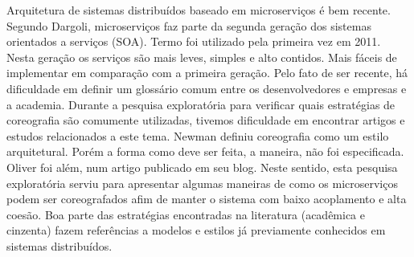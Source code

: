 \documentclass[12pt]{article}
\theoremstyle{plain}
\begin{document}
Arquitetura de sistemas distribuídos baseado em microserviços é bem recente. Segundo Dargoli, microserviços faz parte da segunda geração dos sistemas orientados a serviços (SOA). Termo foi utilizado pela primeira vez em 2011. Nesta geração os serviços são mais leves, simples e alto contidos. Mais fáceis de implementar em comparação com a primeira geração. Pelo fato de ser recente, há dificuldade em definir um glossário comum entre os desenvolvedores e empresas e a academia. Durante a pesquisa exploratória para verificar quais estratégias de coreografia são comumente utilizadas, tivemos dificuldade em encontrar artigos e estudos relacionados a este tema. Newman definiu coreografia como um estilo arquitetural. Porém a forma como deve ser feita, a maneira, não foi especificada. Oliver foi além, num artigo publicado em seu blog. 
Neste sentido, esta pesquisa exploratória serviu para apresentar algumas maneiras de como os microserviços podem ser coreografados afim de manter o sistema com baixo acoplamento e alta coesão. Boa parte das estratégias encontradas na literatura (acadêmica e cinzenta) fazem referências a modelos e estilos já previamente conhecidos em sistemas distribuídos. 




\end{document}
